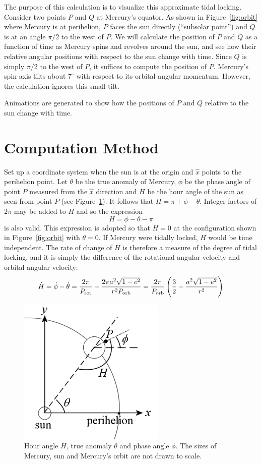 \documentclass[12pt]{article}
\newcommand \beq {\begin{equation}}
\newcommand \eeq {\end{equation}}
\newcommand{\prot}{P_{\rm rot}}
\newcommand{\porb}{P_{\rm orb}}
\begin{document}
The purpose of this calculation is to visualize this approximate tidal locking. 
Consider two points $P$ and $Q$ at Mercury's equator. As shown in 
Figure~\ref{fig:orbit} where Mercury is at perihelion, $P$ faces the sun directly 
(``subsolar point'') and $Q$ is at an angle $\pi/2$ to the west of $P$. We will 
calculate the position of $P$ and $Q$ as a function of time as Mercury spins and revolves 
around the sun, and see how their relative angular positions with respect to the 
sun change with time. Since $Q$ is simply $\pi/2$ to the west of $P$, it suffices 
to compute the position of $P$. Mercury's spin axis tilts about $7^\circ$ with 
respect to its orbital angular momentum. However, the calculation ignores this 
small tilt. 

Animations are generated to show how the positions of $P$ and $Q$ relative to the 
sun change with time.

\section{Computation Method} 

Set up a coordinate system when the sun is at the origin and $\hat{x}$
points to the perihelion point. Let $\theta$ be the true anomaly of Mercury,
$\phi$ be the phase angle of point $P$ measured from the $\hat{x}$ direction and
$H$ be the hour angle of the sun as seen from point $P$ (see Figure~\ref{fig:angles}).
It follows that $H=\pi + \phi - \theta$. Integer factors of $2\pi$ may be added 
to $H$ and so the expression 
\beq
  H = \phi - \theta - \pi
\label{eq:H}
\eeq
is also valid. This expression is adopted so that $H=0$ at the configuration 
shown in Figure~\ref{fig:orbit} with $\theta=0$. If Mercury were tidally locked, 
$H$ would be time independent. The rate of change of $H$ is therefore a measure of 
the degree of tidal locking, and it is simply the difference of the rotational 
angular velocity and orbital angular velocity:
\beq
  \dot{H} = \dot{\phi} - \dot{\theta} = \frac{2\pi}{\prot} - \frac{2\pi a^2 \sqrt{1-e^2}}
{r^2 \porb} = \frac{2\pi}{\porb}\left( \frac{3}{2} - \frac{a^2 \sqrt{1-e^2}}{r^2} \right)
\label{eq:Hdot1}
\eeq

\begin{figure}
\vskip -5mm
\includegraphics[width=7cm]{angles.png}
\caption{Hour angle $H$, true anomaly $\theta$ and phase angle $\phi$. The sizes
of Mercury, sun and Mercury's orbit are not drawn to scale.}
\label{fig:angles}
\end{figure}
\end{document}
